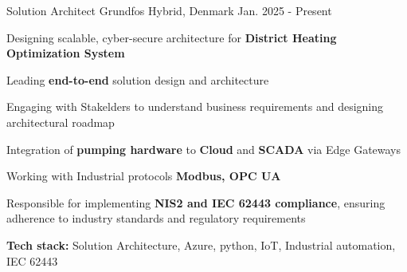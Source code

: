 


\begin{cventries}


\cventry
{Solution Architect} %
{Grundfos} %
{Hybrid, Denmark} %
{Jan. 2025 - Present} %
{ %
\begin{cvitems}
\item Designing scalable, cyber-secure architecture for \textbf{District Heating Optimization System}
\item Leading \textbf{end-to-end} solution design and architecture
\item Engaging with Stakelders to understand business requirements and designing architectural roadmap
\item Integration of \textbf{pumping hardware} to \textbf{Cloud} and \textbf{SCADA} via Edge Gateways
\item Working with Industrial protocols \textbf{Modbus, OPC UA}
\item Responsible for implementing \textbf{NIS2 and IEC 62443 compliance}, ensuring adherence to industry standards and regulatory requirements
\item \textbf{Tech stack:} Solution Architecture, Azure, python, IoT, Industrial automation, IEC 62443
\end{cvitems}
}




\end{cventries}
